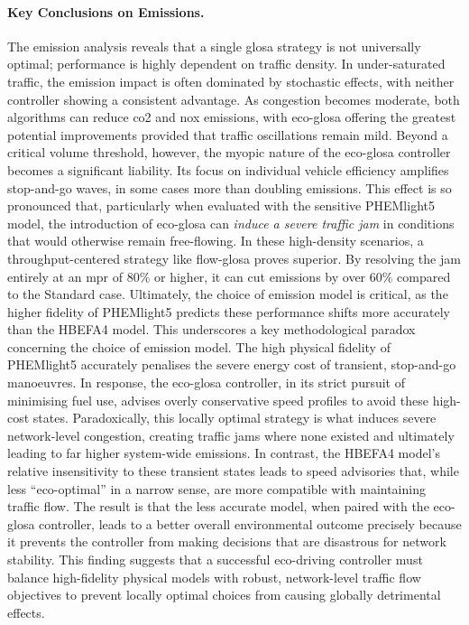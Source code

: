 \paragraph{Key Conclusions on Emissions.}
The emission analysis reveals that a single \ac{glosa} strategy is not universally optimal; performance is highly dependent on traffic density. In under-saturated traffic, the emission impact is often dominated by stochastic effects, with neither controller showing a consistent advantage. As congestion becomes moderate, both algorithms can reduce \ac{co2} and \ac{nox} emissions, with \ac{eco-glosa} offering the greatest potential improvements provided that traffic oscillations remain mild.
\mynewline
Beyond a critical volume threshold, however, the myopic nature of the \ac{eco-glosa} controller becomes a significant liability. Its focus on individual vehicle efficiency amplifies stop-and-go waves, in some cases more than doubling emissions. This effect is so pronounced that, particularly when evaluated with the sensitive PHEMlight5 model, the introduction of \ac{eco-glosa} can \textit{induce a severe traffic jam} in conditions that would otherwise remain free-flowing. In these high-density scenarios, a throughput-centered strategy like \ac{flow-glosa} proves superior. By resolving the jam entirely at an \ac{mpr} of $80\%$ or higher, it can cut emissions by over $60\%$ compared to the Standard case. Ultimately, the choice of emission model is critical, as the higher fidelity of PHEMlight5 predicts these performance shifts more accurately than the HBEFA4 model.
\mynewline
This underscores a key methodological paradox concerning the choice of emission model. The high physical fidelity of PHEMlight5 accurately penalises the severe energy cost of transient, stop-and-go manoeuvres. In response, the \ac{eco-glosa} controller, in its strict pursuit of minimising fuel use, advises overly conservative speed profiles to avoid these high-cost states. Paradoxically, this locally optimal strategy is what induces severe network-level congestion, creating traffic jams where none existed and ultimately leading to far higher system-wide emissions. In contrast, the HBEFA4 model's relative insensitivity to these transient states leads to speed advisories that, while less \enquote{eco-optimal} in a narrow sense, are more compatible with maintaining traffic flow. The result is that the less accurate model, when paired with the \ac{eco-glosa} controller, leads to a better overall environmental outcome precisely because it prevents the controller from making decisions that are disastrous for network stability. This finding suggests that a successful eco-driving controller must balance high-fidelity physical models with robust, network-level traffic flow objectives to prevent locally optimal choices from causing globally detrimental effects.


